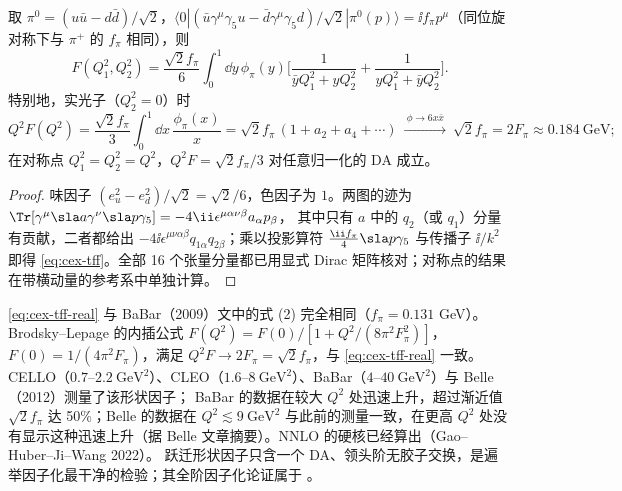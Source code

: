 \begin{proposition}[LO 跃迁形状因子]\tagR\label{prop:cex-tff}
取 $\pi^0=(u\bar u-d\bar d)/\sqrt2$，$\langle0|(\bar u\gamma^\mu\gamma_5u-\bar d\gamma^\mu\gamma_5d)/\sqrt2|\pi^0(p)\rangle=\ii f_\pi p^\mu$（同位旋对称下与 $\pi^+$ 的 $f_\pi$ 相同），则
\begin{equation}\label{eq:cex-tff}
F(Q_1^2,Q_2^2)=\frac{\sqrt2f_\pi}{6}\int_0^1\!\dd y\,\phi_\pi(y)\Big[\frac{1}{\bar yQ_1^2+yQ_2^2}+\frac{1}{yQ_1^2+\bar yQ_2^2}\Big].
\end{equation}
特别地，实光子（$Q_2^2=0$）时
\begin{equation}\label{eq:cex-tff-real}
Q^2F(Q^2)=\frac{\sqrt2f_\pi}{3}\int_0^1\!\dd x\,\frac{\phi_\pi(x)}{x}=\sqrt2f_\pi\,(1+a_2+a_4+\cdots)\ \xrightarrow{\ \phi\to6x\bar x\ }\ \sqrt2f_\pi=2F_\pi\approx0.184\ \mathrm{GeV};
\end{equation}
在对称点 $Q_1^2=Q_2^2=Q^2$，$Q^2F=\sqrt2f_\pi/3$ 对任意归一化的 DA 成立。
\end{proposition}

\begin{proof}
味因子 $(e_u^2-e_d^2)/\sqrt2=\sqrt2/6$，色因子为 $1$。两图的迹为 $\Tr[\gamma^\mu\sla a\gamma^\nu\sla p\gamma_5]=-4\ii\epsilon^{\mu\alpha\nu\beta}a_\alpha p_\beta$，
其中只有 $a$ 中的 $q_2$（或 $q_1$）分量有贡献，二者都给出 $-4\ii\epsilon^{\mu\nu\alpha\beta}q_{1\alpha}q_{2\beta}$；乘以投影算符 $\frac{\ii f_\pi}4\sla p\gamma_5$ 与传播子
$\ii/k^2$ 即得 \cref{eq:cex-tff}。全部 16 个张量分量都已用显式 Dirac 矩阵核对；对称点的结果在带横动量的参考系中单独计算。
\end{proof}

\begin{remark}[与文献及数据的对照]\label{rem:cex-tff-lit}
\cref{eq:cex-tff-real} 与 BaBar（2009）文中的式 (2) 完全相同（$f_\pi=0.131$ GeV）。Brodsky--Lepage 的内插公式
$F(Q^2)=F(0)/[1+Q^2/(8\pi^2F_\pi^2)]$，$F(0)=1/(4\pi^2F_\pi)$，满足 $Q^2F\to2F_\pi=\sqrt2f_\pi$，与 \cref{eq:cex-tff-real} 一致。
CELLO（$0.7$--$2.2\ \mathrm{GeV}^2$）、CLEO（$1.6$--$8\ \mathrm{GeV}^2$）、BaBar（$4$--$40\ \mathrm{GeV}^2$）与 Belle（2012）测量了该形状因子；
BaBar 的数据在较大 $Q^2$ 处迅速上升，超过渐近值 $\sqrt2f_\pi$ 达 50\%；Belle 的数据在 $Q^2\lesssim9\ \mathrm{GeV}^2$ 与此前的测量一致，在更高 $Q^2$ 处没有显示这种迅速上升（据 Belle 文章摘要）。NNLO 的硬核已经算出（Gao--Huber--Ji--Wang 2022）。
跃迁形状因子只含一个 DA、领头阶无胶子交换，是遍举因子化最干净的检验；其全阶因子化论证属于 \tagA。
\end{remark}
